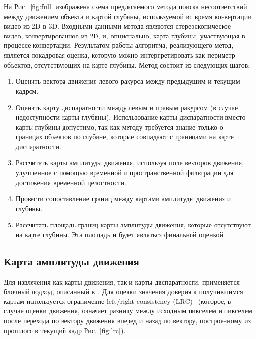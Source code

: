 \documentclass[14pt, a4paper]{extarticle}
\begin{document}
На Рис.~\ref{fig:full} изображена схема предлагаемого метода поиска несоответствий между
движением объекта и картой глубины, используемой во время конвертации видео из 2D в 3D.
Входными данными метода являются стереоскопическое видео, конвертированное из 2D, и,
опционально, карта глубины, участвующая в процессе конвертации. Результатом работы
алгоритма, реализующего метод, является покадровая оценка, которую можно интерпретировать 
как периметр объектов, отсутствующих на карте глубины. Метод состоит из следующих шагов:

\begin{enumerate}
	\item Оценить вектора движения левого ракурса между предыдущим и текущим кадром.
	\item Оценить карту диспаратности между левым и правым ракурсом (в случае недоступности карты глубины).
	Использование карты диспаратности вместо карты глубины допустимо, так как методу требуется
	знание только о границах объектов по глубине, которые совпадают с границами на карте диспаратности.
	\item Рассчитать карты амплитуды движения, используя поле векторов движения, улучшенное
	с помощью временной и пространственной фильтрации для достижения временной целостности.
	\item Провести сопоставление границ между картами амплитуды движения и глубины.
	\item Рассчитать площадь границ карты амплитуды движения, которые отсутствуют на карте глубины.
	Эта площадь и будет являться финальной оценкой.
\end{enumerate}

\subsection{Карта амплитуды движения}



Для извлечения как карты движения, так и карты диспаратности, применяется блочный подход,
описанный в~\cite{simonyan2008fast}. Для оценки значения доверия к получившимся картам используется
ограничение left\slash right-consistency (LRC)~\cite{egnal2004stereo} (которое, в случае оценки движения,
означает разницу между исходным пикселем и пикселем после перехода по вектору движения 
вперед и назад по вектору, построенному из прошлого в текущий кадр Рис.~\ref{fig:lrc}).



\end{document}
